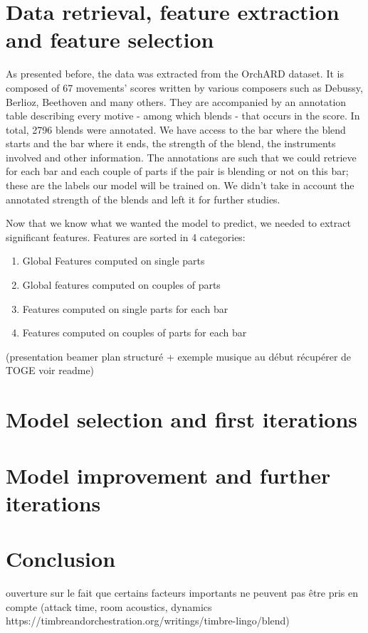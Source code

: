 \documentclass[11pt, a4paper]{article}
\begin{document}
\newpage

\tableofcontents

\newpage

\section{Data retrieval, feature extraction and feature selection}

As presented before, the data was extracted from the OrchARD dataset.
It is composed of 67 movements' scores written by various composers such as Debussy, Berlioz, Beethoven and many others.
They are accompanied by an annotation table describing every motive - among which blends - that occurs in the score. In total, 2796 blends were annotated.
We have access to the bar where the blend starts and the bar where it ends, the strength of the blend, the instruments involved and other information.
The annotations are such that we could retrieve for each bar and each couple of parts if the pair is blending or not on this bar; these are the labels our model will be trained on.
We didn't take in account the annotated strength of the blends and left it for further studies.

Now that we know what we wanted the model to predict, we needed to extract significant features.
Features are sorted in 4 categories:
\begin{enumerate}
    \item Global Features computed on single parts
    \item Global features computed on couples of parts
    \item Features computed on single parts for each bar
    \item Features computed on couples of parts for each bar
\end{enumerate}

(presentation beamer plan structuré + exemple musique au début récupérer de TOGE voir readme)

\section{Model selection and first iterations}

\section{Model improvement and further iterations}

\section{Conclusion}

ouverture sur le fait que certains facteurs importants ne peuvent pas être pris en compte (attack time, room acoustics, dynamics https://timbreandorchestration.org/writings/timbre-lingo/blend)

\newpage

\printbibliography%
\end{document}
